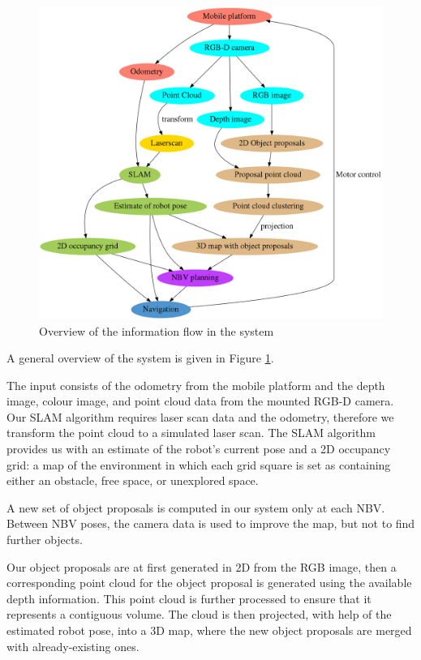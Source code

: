 \begin{figure}[ht]
	\begin{center}
		\includegraphics[width=0.85\linewidth]{dot/overview.png} 
		\caption{Overview of the information flow in the system}
		\label{fig:overview}
	\end{center}
\end{figure}

A general overview of the system is given in Figure \ref{fig:overview}.

The input consists of the odometry from the mobile platform and the depth image, colour image, and point cloud data from the mounted RGB-D camera.
Our SLAM algorithm requires laser scan data and the odometry, therefore we transform the point cloud to a simulated laser scan.
The SLAM algorithm provides us with an estimate of the robot's current pose and a 2D occupancy grid: a map of the environment in which each grid square is set as containing either an obstacle, free space, or unexplored space. 

A new set of object proposals is computed in our system only at each NBV.
Between NBV poses, the camera data is used to improve the map, but not to find further objects.

Our object proposals are at first generated in 2D from the RGB image, then a corresponding point cloud for the object proposal is generated using the available depth information.
This point cloud is further processed to ensure that it represents a contiguous volume.
The cloud is then projected, with help of the estimated robot pose, into a 3D map, where the new object proposals are merged with already-existing ones.

